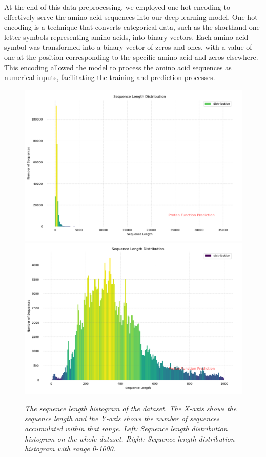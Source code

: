 \documentclass[conference]{IEEEtran}
\begin{document}
At the end of this data preprocessing, we employed one-hot encoding to effectively serve the amino acid sequences into our deep learning model. One-hot encoding is a technique that converts categorical data, such as the shorthand one-letter symbols representing amino acids, into binary vectors. Each amino acid symbol was transformed into a binary vector of zeros and ones, with a value of one at the position corresponding to the specific amino acid and zeros elsewhere. This encoding allowed the model to process the amino acid sequences as numerical inputs, facilitating the training and prediction processes.


\begin{figure}[htp]
    \centering
    \includegraphics[width=1\linewidth]{images/protein_size1.png}
    \includegraphics[width=1\linewidth]{images/protein_size2.png}
    \caption{\emph{The sequence length histogram of the dataset. The X-axis shows the sequence length and the Y-axis shows the number of sequences accumulated within that range. Left: Sequence length distribution histogram on the whole dataset. Right: Sequence length distribution histogram with range 0-1000.}}
\label{fig:comparison}
\end{figure}
\end{document}
